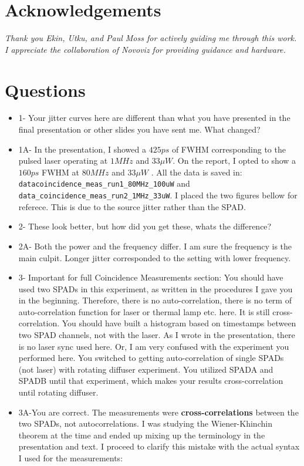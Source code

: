 \section*{Acknowledgements}
\textit{Thank you Ekin, Utku, and Paul Moss for actively guiding me through this work. I appreciate the collaboration of Novoviz for providing guidance and hardware.}

\section*{Questions}
\begin{itemize}
    \item 1- Your jitter curves here are different than what you have presented in the final presentation or other slides you have sent me. What changed? 
    \item 1A- In the presentation, I showed a $425 ps$ of FWHM corresponding to the pulsed laser operating at $1MHz$ and $33 \mu W$. On the report, I opted to show a $160 ps$ FWHM at $80MHz$ and $33 \mu W$ . All the data is saved in: \verb|datacoincidence_meas_run1_80MHz_100uW| and \verb|data_coincidence_meas_run2_1MHz_33uW|. I placed the two figures bellow for referece. This is due to the source jitter rather than the SPAD. 
    \item 2- These look better, but how did you get these, whats the difference? 
    \item 2A- Both the power and the frequency differ. I am sure the frequency is the main culpit. Longer jitter corresponded to the setting with lower frequency. 
    \item 3- Important for full Coincidence Measurements section: You should have used two SPADs in this
experiment, as written in the procedures I gave you in the beginning. Therefore,
there is no auto-correlation, there is no term of auto-correlation function for
laser or thermal lamp etc. here. It is still cross-correlation. You should have
built a histogram based on timestamps between two SPAD channels, not with
the laser. As I wrote in the presentation, there is no laser sync used here. Or, I
am very confused with the experiment you performed here. You switched to
getting auto-correlation of single SPADs (not laser) with rotating diffuser
experiment. You utilized SPADA and SPADB until that experiment, which makes
your results cross-correlation until rotating diffuser. 
\item 3A-You are correct. The measurements were \textbf{cross-correlations} between the two SPADs, not autocorrelations. I was studying the Wiener-Khinchin theorem at the time and ended up mixing up the terminology in the presentation and text. I proceed to clarify this mistake with the actual syntax I used for the measurements:

\end{itemize}
